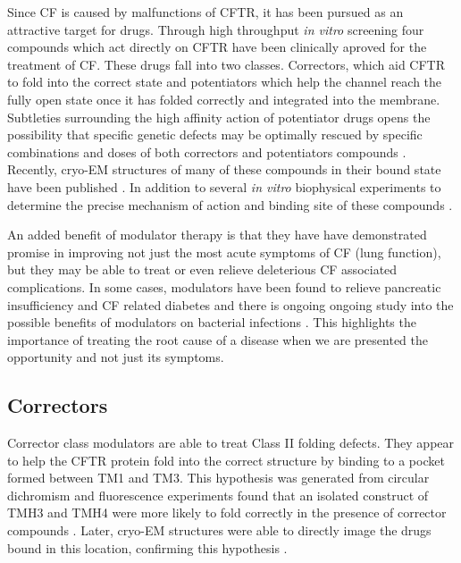 Since CF is caused by malfunctions of CFTR, it has been pursued as an attractive target for drugs. Through high throughput \textit{in vitro} screening four compounds which act directly on CFTR have been clinically aproved for the treatment of CF. These drugs fall into two classes. Correctors, which aid CFTR to fold into the correct state and potentiators which help the channel reach the fully open state once it has folded correctly and integrated into the membrane. Subtleties surrounding the high affinity action of potentiator drugs opens the possibility that specific genetic defects may be optimally rescued by specific combinations and doses of both correctors and potentiators compounds \cite{csanady2019}. Recently, cryo-EM structures of many of these compounds in their bound state have been published \cite{liu2019, fiedorczuk2022}. In addition to several \textit {in vitro} biophysical experiments to determine the precise mechanism of action and binding site of these compounds \cite{csanady2019,  laselva2022, yeh2017, yeh2019, fiedorczuk2022, krainer2018}.

An added benefit of modulator therapy is that they have have demonstrated promise in improving not just the most acute symptoms of CF (lung function), but they may be able to treat or even relieve deleterious CF associated complications. In some cases, modulators have been found to relieve pancreatic insufficiency and CF related diabetes \cite{gaines2021,lopes-pacheco2020, yi2021} and there is ongoing ongoing study into the possible benefits of modulators on bacterial infections \cite{harvey2022}. This highlights the importance of treating the root cause of a disease when we are presented the opportunity and not just its symptoms. 

\subsection{Correctors}
Corrector class modulators are able to treat Class II folding defects. They appear to help the CFTR protein fold into the correct structure by binding to a pocket formed between TM1 and TM3. This hypothesis was generated from circular dichromism \cite{greenfield2006} and fluorescence experiments found that an isolated construct of TMH3 and TMH4 were more likely to fold correctly in the presence of corrector compounds \cite{krainer2018}. Later, cryo-EM structures were able to directly image the drugs bound in this location, confirming this hypothesis \cite{fiedorczuk2022}. 

